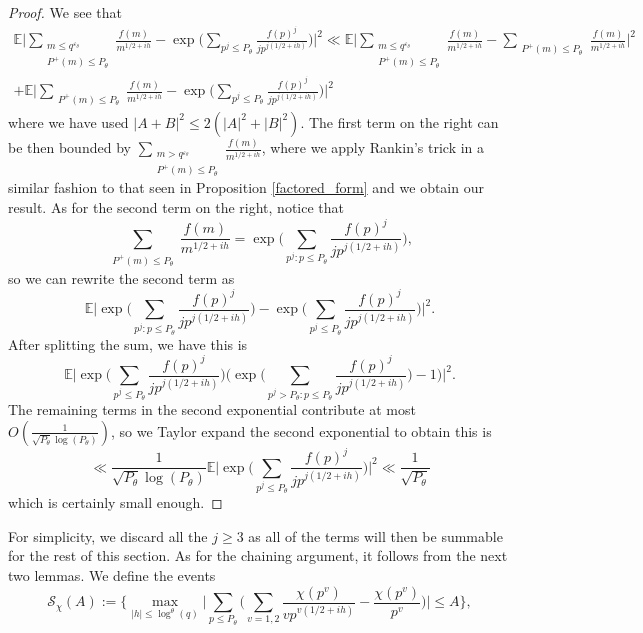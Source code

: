 \documentclass[reqno]{amsart}
\theoremstyle{definition}
\theoremstyle{remark}
\numberwithin{equation}{section}
\theoremstyle{remark}
\begin{document}
\begin{proof}
    We see that
    \begin{equation*}
        \begin{split}\mathbb{E}\big|\sum_{\substack{m \leq q^{\varepsilon_\theta} \\ P^+(m) \leq P_\theta}}\frac{f(m)}{m^{1/2+ih}} - \exp\big(\sum_{p^j \leq P_\theta}\frac{f(p)^j}{jp^{j(1/2+ih)}}\big)\big|^2 \ll \mathbb{E}\big|\sum_{\substack{m \leq q^{\varepsilon_\theta} \\ P^+(m) \leq P_\theta}}\frac{f(m)}{m^{1/2+ih}}-\sum_{\substack{P^+(m) \leq P_\theta}}\frac{f(m)}{m^{1/2+ih}}\big|^2 \\ +\mathbb{E}\big|\sum_{\substack{P^+(m) \leq P_\theta}}\frac{f(m)}{m^{1/2+ih}}-\exp\big(\sum_{p^j \leq P_\theta}\frac{f(p)^j}{jp^{j(1/2+ih)}}\big)\big|^2\end{split}
    \end{equation*}
    where we have used $|A+B|^2 \leq 2(|A|^2+|B|^2)$. The first term on the right can be then bounded by $\sum_{\substack{m > q^{\varepsilon_\theta} \\ P^+(m) \leq P_\theta}}\frac{f(m)}{m^{1/2+ih}}$, where we apply Rankin's trick in a similar fashion to that seen in Proposition \ref{factored_form} and we obtain our result. As for the second term on the right, notice that
    $$\sum_{\substack{P^+(m) \leq P_\theta}}\frac{f(m)}{m^{1/2+ih}} = \exp\bigg(\sum_{p^j :p \leq P_\theta}\frac{f(p)^j}{jp^{j(1/2+ih)}}\bigg),$$
    so we can rewrite the second term as
    $$\mathbb{E}\big|\exp\big(\sum_{p^j :p \leq P_\theta}\frac{f(p)^j}{jp^{j(1/2+ih)}}\big)-\exp\big(\sum_{p^j \leq P_\theta}\frac{f(p)^j}{jp^{j(1/2+ih)}}\big)\big|^2.$$
    After splitting the sum, we have this is
    $$\mathbb{E}\big|\exp\big(\sum_{p^j \leq P_\theta}\frac{f(p)^j}{jp^{j(1/2+ih)}}\big)\big(\exp\big(\sum_{p^j >P_\theta:p \leq P_\theta}\frac{f(p)^j}{jp^{j(1/2+ih)}}\big)-1\big)\big|^2.$$
    The remaining terms in the second exponential contribute at most $O(\frac{1}{\sqrt{P_\theta}\log(P_\theta)})$, so we Taylor expand the second exponential to obtain this is
    $$\ll \frac{1}{\sqrt{P_\theta}\log(P_\theta)}\mathbb{E}\big|\exp\big(\sum_{p^j \leq P_\theta}\frac{f(p)^j}{jp^{j(1/2+ih)}}\big)\big|^2 \ll \frac{1}{\sqrt{P_\theta}}$$
    which is certainly small enough.
\end{proof}
For simplicity, we discard all the $j \geq 3$ as all of the terms will then be summable for the rest of this section. As for the chaining argument, it follows from the next two lemmas. We define the events
\begin{equation}
    \mathcal{S}_\chi(A) :=\big\{\max_{|h| \leq \log^{\theta}(q)}\big|\sum_{p \leq P_\theta}\bigg(\sum_{v=1,2}\frac{\chi(p^v)}{vp^{v(1/2+ih)}}-\frac{\chi(p^v)}{p^{v}}\bigg) \big| \leq A\big\}, \label{central_char_shift}
\end{equation}
\end{document}
